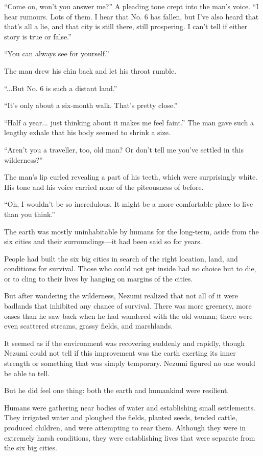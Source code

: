 ``Come on, won't you answer me?'' A pleading tone crept into the man's
voice. ``I hear rumours. Lots of them. I hear that No. 6 has fallen, but
I've also heard that that's all a lie, and that city is still there,
still prospering. I can't tell if either story is true or false.''

``You can always see for yourself.''

The man drew his chin back and let his throat rumble.

``...But No. 6 is such a distant land.''

``It's only about a six-month walk. That's pretty close.''

``Half a year... just thinking about it makes me feel faint.'' The man
gave such a lengthy exhale that his body seemed to shrink a size.

``Aren't you a traveller, too, old man? Or don't tell me you've settled
in this wilderness?''

The man's lip curled revealing a part of his teeth, which were
surprisingly white. His tone and his voice carried none of the
piteousness of before.

``Oh, I wouldn't be so incredulous. It might be a more comfortable place
to live than you think.''

The earth was mostly uninhabitable by humans for the long-term, aside
from the six cities and their surroundings---it had been said so for
years.

People had built the six big cities in search of the right location,
land, and conditions for survival. Those who could not get inside had no
choice but to die, or to cling to their lives by hanging on margins of
the cities.

But after wandering the wilderness, Nezumi realized that not all of it
were badlands that inhibited any chance of survival. There was more
greenery, more oases than he saw back when he had wandered with the old
woman; there were even scattered streams, grassy fields, and marshlands.

It seemed as if the environment was recovering suddenly and rapidly,
though Nezumi could not tell if this improvement was the earth exerting
its inner strength or something that was simply temporary. Nezumi
figured no one would be able to tell.

But he did feel one thing: both the earth and humankind were resilient.

Humans were gathering near bodies of water and establishing small
settlements. They irrigated water and ploughed the fields, planted
seeds, tended cattle, produced children, and were attempting to rear
them. Although they were in extremely harsh conditions, they were
establishing lives that were separate from the six big cities.

